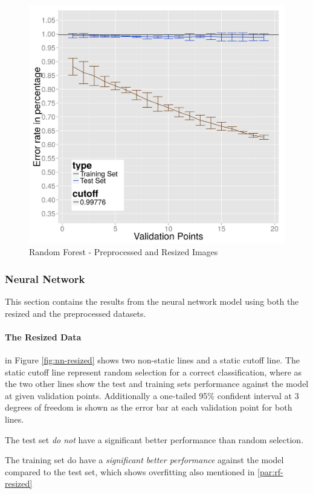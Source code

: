 \begin{figure}
  \centering
  \includegraphics[width=0.9\linewidth]{Images/DRFpreprocessed}
  \caption{Random Forest - Preprocessed and Resized Images}
  \label{fig:rf-preprocessed}
\end{figure}

\subsubsection{Neural Network}
\label{subsubsec:neuralnetwork}
This section contains the results from the neural network model using both the resized and the preprocessed datasets.

\paragraph{The Resized Data}
in Figure \ref{fig:nn-resized} shows two non-static lines and a static cutoff line.
The static cutoff line represent random selection for a correct classification, where as the two other lines show the test and training sets performance against the model at given validation points. Additionally a one-tailed 95\% confident interval at 3 degrees of freedom is shown as the error bar at each validation point for both lines.

The test set \emph{do not} have a significant better performance than random selection.

The training set do have a \emph{significant better performance} against the model compared to the test set, which shows overfitting also mentioned in \ref{par:rf-resized}

